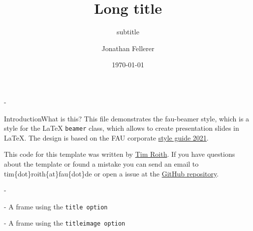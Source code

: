 \documentclass[final]{beamer}
\title[Short title]{Long title}
\subtitle{subtitle}
\author[J. Fellerer]{
Jonathan Fellerer%
}
\institute[FAU]{%
Friedrich-Alexander-Universität Erlangen-Nürnberg, Computer Science 7%
}
\date{\today}
\begin{document}
\begin{frame}[t,titleimagenofooter]{-}
\titlepage%
\end{frame}

\begin{frame}[t]{Introduction}{What is this?}
This file demonstrates the fau-beamer style, which is a style for the \LaTeX{} \texttt{beamer} class, which allows to create presentation slides in \LaTeX. The design is based on the FAU corporate \href{https://www.intern.fau.de/kommunikation-marketing-und-corporate-identity/corporate-identity/}{ style guide 2021}.

This code for this template was written by \href{https://timroith.github.io/}{Tim Roith}. If you have questions about the template or found a mistake you can send an email to tim\{dot\}roith\{at\}fau\{dot\}de or open a issue at the \href{https://github.com/FAU-AMMN/fau-beamer}{GitHub repository}.
\end{frame}


% 
\begin{frame}[title]{-}
\tableofcontents
\end{frame}

\begin{frame}[t,title]{-}
A frame using the \texttt{title option}
\end{frame}

\begin{frame}[t,titleimage]{-}
A frame using the \texttt{titleimage option}
\end{frame}

%
%
%

\end{document}

